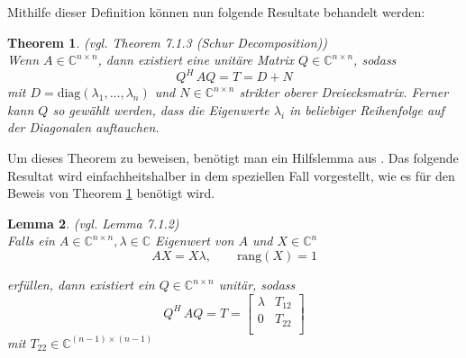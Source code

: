 \documentclass[a4paper,12pt]{report}
\newcommand{\C}{\mathbb C}
\newcommand{\diag}{\text{diag}}
\newcommand{\rang}{\text{rang}}
\newcommand{\1}{\mathds{1}}
\theoremstyle{plain} %
\newtheorem{theorem}{Theorem}
\newtheorem{lemma}[theorem]{Lemma}  %
\theoremstyle{definition} %
\theoremstyle{remark}
\begin{document}
            Mithilfe dieser Definition können nun folgende Resultate behandelt werden:
            \begin{theorem}(vgl. Theorem 7.1.3 (Schur Decomposition)\cite[S. 313]{matrixGolub})\\
                  \label{thrm: Schur Zerlegung}
                  Wenn $A \in \C^{n\times n}$, dann existiert eine unitäre Matrix $Q\in\C^{n\times n}$, sodass
                  \begin{equation}
                        \label{eqn: Schur_Resultat}
                        Q^H\,AQ = T = D+N
                  \end{equation}
                  mit $D=\diag(\lambda_1,\dots,\lambda_n)$ und $N\in\C^{n\times n}$ strikter oberer Dreiecksmatrix.
                  Ferner kann $Q$ so gewählt werden, dass die Eigenwerte $\lambda_i$ in beliebiger Reihenfolge auf der Diagonalen auftauchen.
            \end{theorem}

            Um dieses Theorem zu beweisen, benötigt man ein Hilfslemma aus \cite[S.312]{matrixGolub}.
            Das folgende Resultat wird einfachheitshalber in dem speziellen Fall vorgestellt, wie es für den Beweis von Theorem \ref{thrm: Schur Zerlegung} benötigt wird.

            \begin{lemma}(vgl. Lemma 7.1.2\cite[S. 312]{matrixGolub})
                  \label{lemma: Hilfe Schur}\\
                  Falls ein $A\in\C^{n\times n}, \lambda\in \C$ Eigenwert von $A$ und $X\in \C^{n}$
                  \begin{equation}
                        \label{eqn: Hilfslemma Schur_Bed}
                        AX = X\lambda,\qquad \rang(X)=1
                  \end{equation}
                  
                  erfüllen, dann existiert ein $Q\in \C^{n\times n}$ unitär, sodass
                  $$Q^H\,AQ = T =  \begin{bmatrix}
                        \lambda & T_{12} \\
                        0 & T_{22} \\
                        \end{bmatrix}$$
                  mit $T_{22}\in \C^{(n-1)\times(n-1)}$
            \end{lemma}
\end{document}
